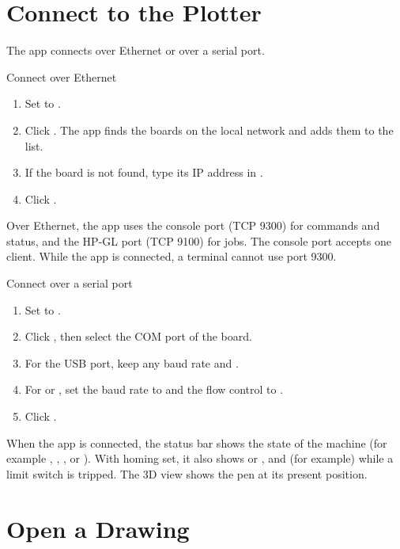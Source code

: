 \section{Connect to the Plotter}\label{sec:app-connect}

The app connects over Ethernet or over a serial port.

\begin{procedure}{Connect over Ethernet}
\begin{enumerate}
  \item Set  to .
  \item Click . The app finds the boards on the local network
        and adds them to the  list.
  \item If the board is not found, type its IP address in .
  \item Click .
\end{enumerate}
\end{procedure}

Over Ethernet, the app uses the console port (TCP 9300) for commands and
status, and the HP-GL port (TCP 9100) for jobs. The console port accepts one
client. While the app is connected, a terminal cannot use port 9300.

\begin{procedure}{Connect over a serial port}
\begin{enumerate}
  \item Set  to .
  \item Click , then select the COM port of the board.
  \item For the USB port, keep any baud rate and .
  \item For  or , set the baud rate to 
        and the flow control to .
  \item Click .
\end{enumerate}
\end{procedure}

When the app is connected, the status bar shows the state of the machine
(for example , , , or ).
With homing set, it also shows  or , and
 (for example) while a limit switch is tripped. The 3D view shows
the pen at its present position.

\section{Open a Drawing}

